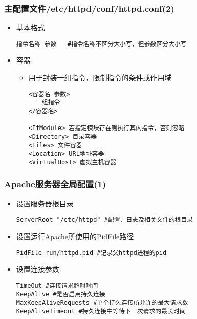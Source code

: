 \documentclass[xcolor=svgnames,presentation]{beamer}
\begin{document}
\begin{frame}[fragile]
\frametitle{主配置文件/etc/httpd/conf/httpd.conf(2)}
\label{sec-1-3}
\begin{itemize}

\item 基本格式\\
\label{sec-1-3-1}%
\begin{verbatim}
指令名称 参数   #指令名称不区分大小写，但参数区分大小写
\end{verbatim}

\item 容器
\label{sec-1-3-2}%
\begin{itemize}

\item 用于封装一组指令，限制指令的条件或作用域\\
\label{sec-1-3-2-1}%
\begin{verbatim}
<容器名 参数>
  一组指令
</容器名>

<IfModule> 若指定模块存在则执行其内指令，否则忽略
<Directory> 目录容器
<Files> 文件容器
<Location> URL地址容器
<VirtualHost> 虚拟主机容器
\end{verbatim}
\end{itemize} %
\end{itemize} %
\end{frame}
\begin{frame}[fragile]
\frametitle{Apache服务器全局配置(1)}
\label{sec-1-4}
\begin{itemize}

\item 设置服务器根目录\\
\label{sec-1-4-1}%
\begin{verbatim}
ServerRoot "/etc/httpd" #配置、日志及相关文件的根目录
\end{verbatim}

\item 设置运行Apache所使用的PidFile路径\\
\label{sec-1-4-2}%
\begin{verbatim}
PidFile run/httpd.pid #记录父httpd进程的pid
\end{verbatim}

\item 设置连接参数\\
\label{sec-1-4-3}%
\begin{verbatim}
TimeOut #连接请求超时时间
KeepAlive #是否启用持久连接
MaxKeepAliveRequests #单个持久连接所允许的最大请求数
KeepAliveTimeout #持久连接中等待下一次请求的最长时间
\end{verbatim}
\end{itemize} %
\end{frame}
\end{document}
